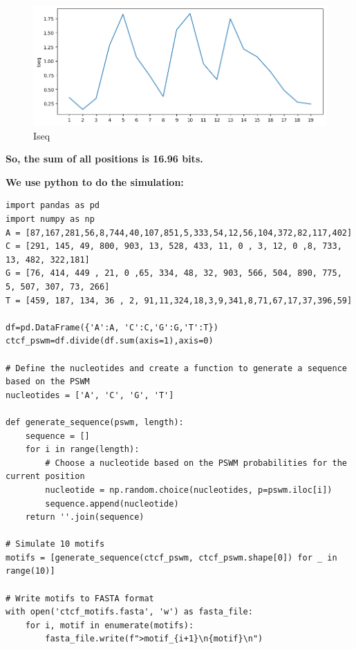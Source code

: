 \documentclass{article}
\begin{document}
\begin{figure}[H]
\begin{minipage}{0.15\textwidth}
    \end{minipage}
    \hfill  %
    \begin{minipage}{0.8\textwidth}
        \centering
        \includegraphics[width=1\textwidth]{Iseqplot.png}

    \end{minipage}
    \caption{Iseq}
\end{figure}

\textbf{So, the sum of all positions is 16.96 bits.}

\textbf{We use python to do the simulation:}
\begin{center}
    \begin{lstlisting}
import pandas as pd
import numpy as np
A = [87,167,281,56,8,744,40,107,851,5,333,54,12,56,104,372,82,117,402]
C = [291, 145, 49, 800, 903, 13, 528, 433, 11, 0 , 3, 12, 0 ,8, 733, 13, 482, 322,181]
G = [76, 414, 449 , 21, 0 ,65, 334, 48, 32, 903, 566, 504, 890, 775, 5, 507, 307, 73, 266]
T = [459, 187, 134, 36 , 2, 91,11,324,18,3,9,341,8,71,67,17,37,396,59]

df=pd.DataFrame({'A':A, 'C':C,'G':G,'T':T})
ctcf_pswm=df.divide(df.sum(axis=1),axis=0)

# Define the nucleotides and create a function to generate a sequence based on the PSWM
nucleotides = ['A', 'C', 'G', 'T']

def generate_sequence(pswm, length):
    sequence = []
    for i in range(length):
        # Choose a nucleotide based on the PSWM probabilities for the current position
        nucleotide = np.random.choice(nucleotides, p=pswm.iloc[i])
        sequence.append(nucleotide)
    return ''.join(sequence)

# Simulate 10 motifs
motifs = [generate_sequence(ctcf_pswm, ctcf_pswm.shape[0]) for _ in range(10)]

# Write motifs to FASTA format
with open('ctcf_motifs.fasta', 'w') as fasta_file:
    for i, motif in enumerate(motifs):
        fasta_file.write(f">motif_{i+1}\n{motif}\n")
    \end{lstlisting}
\end{center}
\end{document}
